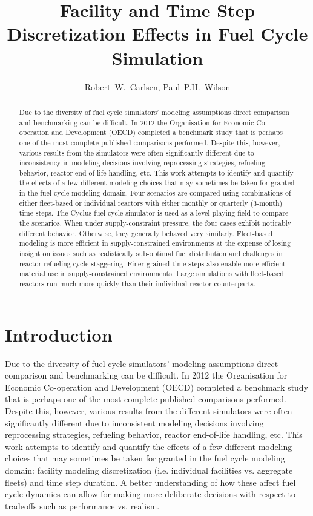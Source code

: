 \documentclass{style}
\title{Facility and Time Step Discretization Effects in Fuel Cycle Simulation}
\author{Robert~W.~Carlsen, Paul~P.H.~Wilson}
\institute{University of Wisconsin - Madison, Department of Nuclear Engineering and Engineering Physics, Madison, WI 53706}
\date{}
\begin{document}
\newpage

\begin{abstract}

Due to the diversity of fuel cycle simulators' modeling assumptions direct
comparison and benchmarking can be difficult.  In 2012 the Organisation for
Economic Co-operation and Development (OECD) completed a benchmark study that
is perhaps one of the most complete published comparisons performed.  Despite
this, however, various results from the simulators were often significantly
different due to inconsistency in modeling decisions involving reprocessing
strategies, refueling behavior, reactor end-of-life handling, etc.  This work
attempts to identify and quantify the effects of a few different modeling
choices that may sometimes be taken for granted in the fuel cycle modeling
domain.  Four scenarios are compared using combinations of either fleet-based
or individual reactors with either monthly or quarterly (3-month) time steps.
The Cyclus fuel cycle simulator is used as a level playing field to compare
the scenarios.  When under supply-constraint pressure, the four cases exhibit
noticably different behavior.  Otherwise, they generally behaved very
similarly.  Fleet-based modeling is more efficient in supply-constrained
environments at the expense of losing insight on issues such as realistically
sub-optimal fuel distribution and challenges in reactor refueling cycle
staggering.  Finer-grained time steps also enable more efficient material use
in supply-constrained environments.  Large simulations with fleet-based
reactors run much more quickly than their individual reactor counterparts.

\end{abstract}

\pagebreak

\section{Introduction}

Due to the diversity of fuel cycle simulators' modeling assumptions direct
comparison and benchmarking can be difficult.  In 2012 the Organisation for
Economic Co-operation and Development (OECD) completed a benchmark study
\cite{oecd2012benchmark} that is perhaps one of the most complete published
comparisons performed.  Despite this, however, various results from the
different simulators were often significantly different due to inconsistent
modeling decisions involving reprocessing strategies, refueling behavior,
reactor end-of-life handling, etc.  This work attempts to identify and
quantify the effects of a few different modeling choices that may sometimes be
taken for granted in the fuel cycle modeling domain: facility modeling
discretization (i.e. individual facilities vs. aggregate fleets) and time step
duration.  A better understanding of how these affect fuel cycle dynamics can
allow for making more deliberate decisions with respect to tradeoffs such as
performance vs. realism.
\end{document}
